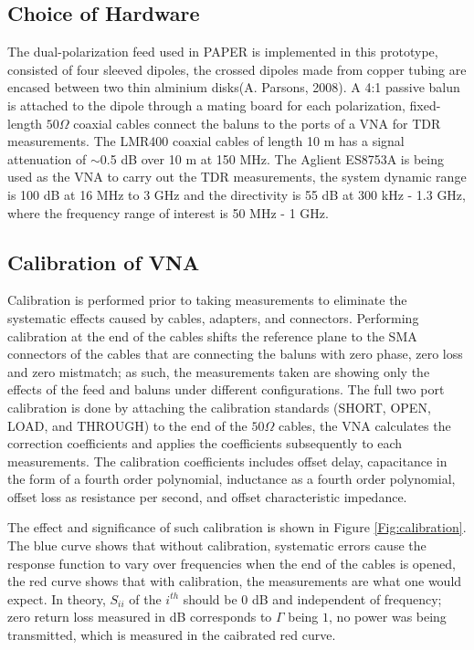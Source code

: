 \documentclass[preprint]{aastex}  %
\begin{document}
\subsection{Choice of Hardware}
The dual-polarization feed used in PAPER is implemented in this prototype, consisted of four sleeved dipoles, the crossed dipoles made from copper tubing are encased between two thin alminium disks(A. Parsons, 2008). A 4:1 passive balun is attached to the dipole through a mating board for each polarization, fixed-length $50\Omega$ coaxial cables connect the baluns to the ports of a VNA for TDR measurements. The LMR400 coaxial cables of length 10 m has a signal attenuation of $\sim$0.5 dB over 10 m at 150 MHz. The Aglient ES8753A is being used as the VNA to carry out the TDR measurements, the system dynamic range is 100 dB at 16 MHz to 3 GHz and the directivity is 55 dB at 300 kHz - 1.3 GHz, where the frequency range of interest is 50 MHz - 1 GHz. 

\subsection{Calibration of VNA}
Calibration is performed prior to taking measurements to eliminate the systematic effects caused by cables, adapters, and connectors. Performing calibration at the end of the cables shifts the reference plane to the SMA connectors of the cables that are connecting the baluns with zero phase, zero loss and zero mistmatch; as such, the measurements taken are showing only the effects of the feed and baluns under different configurations. The full two port calibration is done by attaching the calibration standards (SHORT, OPEN, LOAD, and THROUGH) to the end of the $50\Omega$ cables, the VNA calculates the correction coefficients and applies the coefficients subsequently to each measurements. The calibration coefficients includes offset delay, capacitance in the form of a fourth order polynomial, inductance as a fourth order polynomial, offset loss as resistance per second, and offset characteristic impedance. 

The effect and significance of such calibration is shown in Figure \ref{Fig:calibration}. The blue 
curve shows that without calibration, systematic errors 
cause the response function to vary over frequencies when the end of the cables 
is opened, the red curve shows that with calibration, the 
measurements are what one would expect. In theory, $S_{ii}$ of the $i^{th}$ should be $0$ dB and independent of frequency; zero return loss measured in dB corresponds to $\Gamma$ being $1$, no power was being transmitted, which is measured in the caibrated red curve. 
\end{document}

